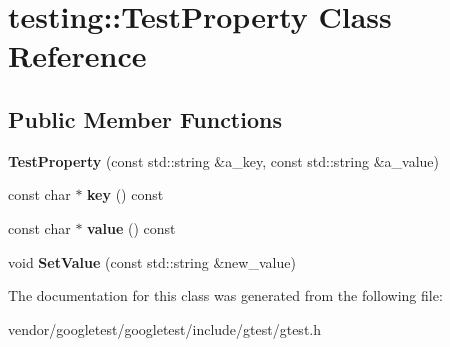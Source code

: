 \hypertarget{classtesting_1_1TestProperty}{}\section{testing\+:\+:Test\+Property Class Reference}
\label{classtesting_1_1TestProperty}
\subsection*{Public Member Functions}
\begin{DoxyCompactItemize}
\item 
{\bfseries Test\+Property} (const std\+::string \&a\+\_\+key, const std\+::string \&a\+\_\+value)\hypertarget{classtesting_1_1TestProperty_a25a0ccf1c75a92af46a48d3c2a873e6d}{}\label{classtesting_1_1TestProperty_a25a0ccf1c75a92af46a48d3c2a873e6d}

\item 
const char $\ast$ {\bfseries key} () const \hypertarget{classtesting_1_1TestProperty_a2c569d47685b89aa64e737fb11df3aba}{}\label{classtesting_1_1TestProperty_a2c569d47685b89aa64e737fb11df3aba}

\item 
const char $\ast$ {\bfseries value} () const \hypertarget{classtesting_1_1TestProperty_ad46323c18491f365d72d8a4288f54bd6}{}\label{classtesting_1_1TestProperty_ad46323c18491f365d72d8a4288f54bd6}

\item 
void {\bfseries Set\+Value} (const std\+::string \&new\+\_\+value)\hypertarget{classtesting_1_1TestProperty_a377245335d9f614cd06d1650e3358e1d}{}\label{classtesting_1_1TestProperty_a377245335d9f614cd06d1650e3358e1d}

\end{DoxyCompactItemize}


The documentation for this class was generated from the following file\+:\begin{DoxyCompactItemize}
\item 
vendor/googletest/googletest/include/gtest/gtest.\+h\end{DoxyCompactItemize}
